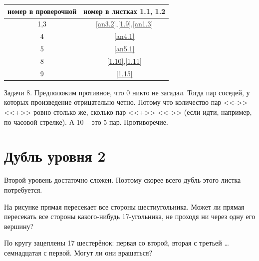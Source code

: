 \begin{table}[h]\centering
	\begin{tabular}{|c|c|}
		\hline
		номер в проверочной&номер в листках 1.1, 1.2\\
		\hline
		1,3&\ref{an3.2},\ref{1.9},\ref{an1.3}\\
		\hline
		4&\ref{an4.1}\\
		\hline
		5&\ref{an5.1}\\
		\hline
		8&\ref{1.10},\ref{1.11}\\
		\hline
		9&\ref{1.15}\\
		\hline
	\end{tabular}
\end{table}
\begin{prf}
	Задачи 8. Предположим противное, что 0 никто не загадал. Тогда пар соседей, у которых произведение отрицательно четно. Потому что количество пар <<->> <<+>> ровно столько же, сколько пар <<+>> <<->> (если идти, например, по часовой стрелке). А 10 -- это 5 пар. Противоречие.
\end{prf}

\section{ Дубль уровня 2}

Второй уровень достаточно сложен. Поэтому скорее всего дубль этого листка потребуется.



\begin{thm}
	\label{f1}
	На рисунке прямая пересекает все стороны шестиугольника. Может ли прямая пересекать все стороны какого-нибудь 17-угольника, не проходя ни через одну его вершину?
\end{thm}


\begin{thm}
	По кругу зацеплены 17 шестерёнок: первая со второй, вторая с третьей \dots семнадцатая с первой. Могут ли они вращаться?
\end{thm}

